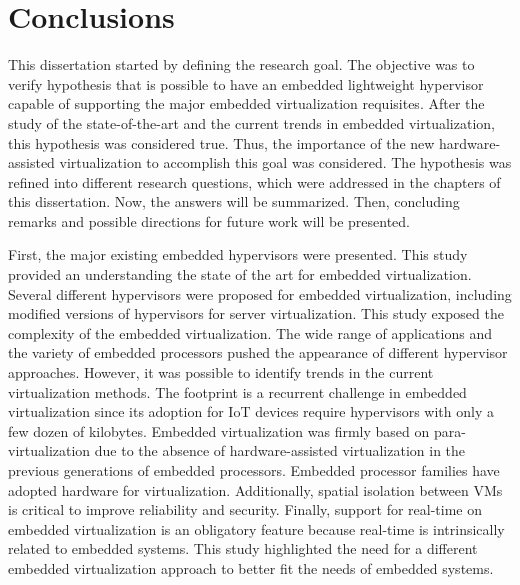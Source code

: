 \chapter{\label{chapter:conclusions}Conclusions}

This dissertation started by defining the research goal. The objective was to verify hypothesis that is possible to have an embedded lightweight hypervisor capable of supporting the major embedded virtualization requisites. After the study of the state-of-the-art and the current trends in embedded virtualization, this hypothesis was considered true. Thus, the importance of the new hardware-assisted virtualization to accomplish this goal was considered. The hypothesis was refined into different research questions, which were addressed in the chapters of this dissertation. Now, the answers will be summarized. Then, concluding remarks and possible directions for future work will be presented. 

First, the major existing embedded hypervisors were presented. This study provided an understanding the state of the art for embedded virtualization. Several different hypervisors were proposed for embedded virtualization, including modified versions of hypervisors for server virtualization. This study exposed the complexity of the embedded virtualization. The wide range of applications and the variety of embedded processors pushed the appearance of different hypervisor approaches. However, it was possible to identify trends in the current virtualization methods. The footprint is a recurrent challenge in embedded virtualization since its adoption for IoT devices require hypervisors with only a few dozen of kilobytes. Embedded virtualization was firmly based on para-virtualization due to the absence of hardware-assisted virtualization in the previous generations of embedded processors. Embedded processor families have adopted hardware for virtualization. Additionally, spatial isolation between VMs is critical to improve reliability and security. Finally, support for real-time on embedded virtualization is an obligatory feature because real-time is intrinsically related to embedded systems. This  study highlighted the need for a different embedded virtualization approach to better fit the needs of embedded systems. 

